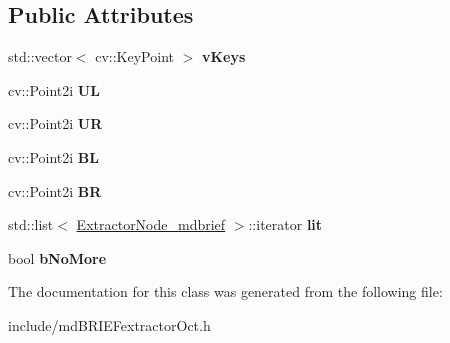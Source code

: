 \subsection*{Public Attributes}
\begin{DoxyCompactItemize}
\item 
std\+::vector$<$ cv\+::\+Key\+Point $>$ {\bfseries v\+Keys}\hypertarget{classMultiColSLAM_1_1ExtractorNode__mdbrief_aec88cb90c80aae9a73dfd9194d9cb7a4}{}\label{classMultiColSLAM_1_1ExtractorNode__mdbrief_aec88cb90c80aae9a73dfd9194d9cb7a4}

\item 
cv\+::\+Point2i {\bfseries UL}\hypertarget{classMultiColSLAM_1_1ExtractorNode__mdbrief_ae1685a789c125a7c3e6e7b822c08592d}{}\label{classMultiColSLAM_1_1ExtractorNode__mdbrief_ae1685a789c125a7c3e6e7b822c08592d}

\item 
cv\+::\+Point2i {\bfseries UR}\hypertarget{classMultiColSLAM_1_1ExtractorNode__mdbrief_a43e6ae76b64cb2a5e652ca38158a2fa4}{}\label{classMultiColSLAM_1_1ExtractorNode__mdbrief_a43e6ae76b64cb2a5e652ca38158a2fa4}

\item 
cv\+::\+Point2i {\bfseries BL}\hypertarget{classMultiColSLAM_1_1ExtractorNode__mdbrief_a21ee9ad0d775f15b76226ae08c0ef3b1}{}\label{classMultiColSLAM_1_1ExtractorNode__mdbrief_a21ee9ad0d775f15b76226ae08c0ef3b1}

\item 
cv\+::\+Point2i {\bfseries BR}\hypertarget{classMultiColSLAM_1_1ExtractorNode__mdbrief_a5cdd7deb1b7b1b5da128cb0fc72bb214}{}\label{classMultiColSLAM_1_1ExtractorNode__mdbrief_a5cdd7deb1b7b1b5da128cb0fc72bb214}

\item 
std\+::list$<$ \hyperlink{classMultiColSLAM_1_1ExtractorNode__mdbrief}{Extractor\+Node\+\_\+mdbrief} $>$\+::iterator {\bfseries lit}\hypertarget{classMultiColSLAM_1_1ExtractorNode__mdbrief_a5d989a8b7c1a91968db699eafbbc97a1}{}\label{classMultiColSLAM_1_1ExtractorNode__mdbrief_a5d989a8b7c1a91968db699eafbbc97a1}

\item 
bool {\bfseries b\+No\+More}\hypertarget{classMultiColSLAM_1_1ExtractorNode__mdbrief_a69042629292a1fd938f348d11e4976c6}{}\label{classMultiColSLAM_1_1ExtractorNode__mdbrief_a69042629292a1fd938f348d11e4976c6}

\end{DoxyCompactItemize}


The documentation for this class was generated from the following file\+:\begin{DoxyCompactItemize}
\item 
include/md\+B\+R\+I\+E\+Fextractor\+Oct.\+h\end{DoxyCompactItemize}
